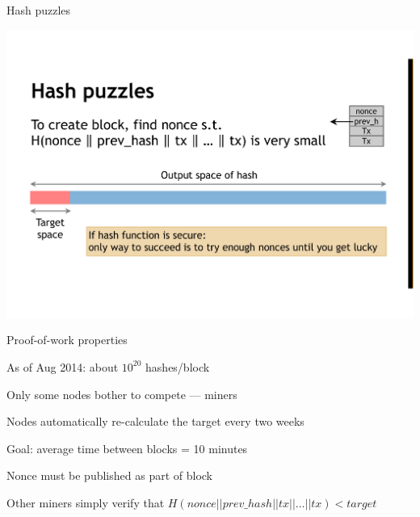 \begin{frame}{Hash puzzles}
	
\includegraphics[width=\textwidth]{puzzle}
	
\end{frame}

\begin{frame}{Proof-of-work properties}
	
\BI
\item As of Aug 2014: about $10^{20}$ hashes/block
\item Only some nodes bother to compete — miners
\EI

\BI
\item Nodes automatically re-calculate the target every two weeks
\item  Goal: average time between blocks = 10 minutes
\EI

\BI
\item Nonce must be published as part of block
\item Other miners simply verify that
$H(\mathit{nonce} || \mathit{prev\_hash} || \mathit{tx} || \ldots || \mathit{tx}) < \mathit{target}$
\EI


\end{frame}

